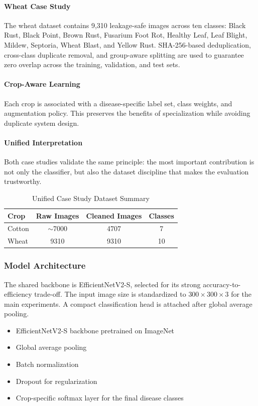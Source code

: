 \documentclass[12pt,a4paper]{report}
\begin{document}
\paragraph{Wheat Case Study}
The wheat dataset contains 9,310 leakage-safe images across ten classes: Black Rust, Black Point, Brown Rust, Fusarium Foot Rot, Healthy Leaf, Leaf Blight, Mildew, Septoria, Wheat Blast, and Yellow Rust. SHA-256-based deduplication, cross-class duplicate removal, and group-aware splitting are used to guarantee zero overlap across the training, validation, and test sets.

\paragraph{Crop-Aware Learning}
Each crop is associated with a disease-specific label set, class weights, and augmentation policy. This preserves the benefits of specialization while avoiding duplicate system design.

\paragraph{Unified Interpretation}
Both case studies validate the same principle: the most important contribution is not only the classifier, but also the dataset discipline that makes the evaluation trustworthy.

\begin{table}[t]
\centering
\caption{Unified Case Study Dataset Summary}
\label{tab:dataset-summary}
\begin{tabular}{lccc}
\hline
Crop & Raw Images & Cleaned Images & Classes \\
\hline
Cotton & $\sim$7000 & 4707 & 7 \\
Wheat & 9310 & 9310 & 10 \\
\hline
\end{tabular}
\end{table}

\subsubsection{Model Architecture}
The shared backbone is EfficientNetV2-S, selected for its strong accuracy-to-efficiency trade-off. The input image size is standardized to $300 \times 300 \times 3$ for the main experiments. A compact classification head is attached after global average pooling.

\begin{itemize}
\item EfficientNetV2-S backbone pretrained on ImageNet
\item Global average pooling
\item Batch normalization
\item Dropout for regularization
\item Crop-specific softmax layer for the final disease classes
\end{itemize}
\end{document}
